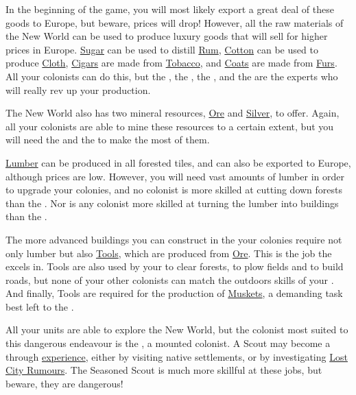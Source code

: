 \documentclass[12pt]{book}
\begin{document}
In the beginning of the game, you will most likely export a great deal
of these goods to Europe, but beware, prices will drop! However, all
the raw materials of the New World can be used to produce luxury goods
that will sell for higher prices in Europe. \hyperlink{Sugar}{Sugar}
can be used to distill \hyperlink{Rum}{Rum},
\hyperlink{Cotton}{Cotton} can be used to produce
\hyperlink{Cloth}{Cloth}, \hyperlink{Cigars}{Cigars} are made from
\hyperlink{Tobacco}{Tobacco}, and \hyperlink{Coats}{Coats} are made
from \hyperlink{Furs}{Furs}. All your colonists can do this, but the
, the , the , and the  are the experts who
will really rev up your production.

The New World also has two mineral resources, \hyperlink{Ore}{Ore} and
\hyperlink{Silver}{Silver}, to offer. Again, all your colonists are
able to mine these resources to a certain extent, but you will need
the  and the  to make
the most of them.

\hyperlink{Lumber}{Lumber} can be produced in all forested tiles, and
can also be exported to Europe, although prices are low. However, you
will need vast amounts of lumber in order to upgrade your colonies,
and no colonist is more skilled at cutting down forests than the
. Nor is any colonist more skilled at turning
the lumber into buildings than the .

The more advanced buildings you can construct in the your colonies
require not only lumber but also \hyperlink{Tools}{Tools}, which are
produced from \hyperlink{Ore}{Ore}. This is the job the  excels in. Tools are also used by your  to
clear forests, to plow fields and to build roads, but none of your 
other colonists can match the outdoors skills of your 
. And finally, Tools are required for the 
production of \hyperlink{Muskets}{Muskets}, a demanding task best 
left to the .

All your units are able to explore the New World, but the colonist
most suited to this dangerous endeavour is the , a mounted
colonist. A Scout may become a  through
\hyperlink{Skills and Education}{experience}, either by visiting
native settlements, or by investigating \hyperlink{Lost City
Rumours}{Lost City Rumours}. The Seasoned Scout is much more skillful
at these jobs, but beware, they are dangerous!
\end{document}
